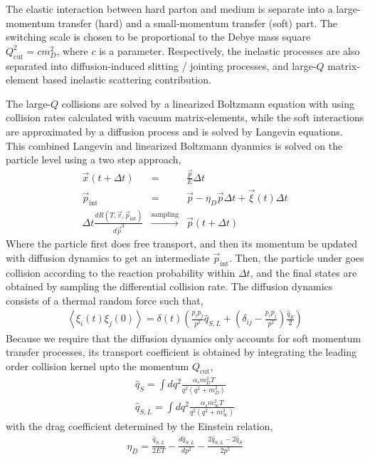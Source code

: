 \documentclass[aps, prc, reprint, amsmath, groupedaddress, nofootinbib]{revtex4-1}
\begin{document}
The elastic interaction between hard parton and medium is separate into a large-momentum transfer (hard) and a small-momentum transfer (soft) part.
The switching scale is chosen to be proportional to the Debye mass square $Q_{\textrm{cut}}^2 = c m_D^2$, where $c$ is a parameter.
Respectively, the inelastic processes are also separated into diffusion-induced slitting / jointing processes, and large-$Q$ matrix-element based inelastic scattering contribution.

The large-$Q$ collisions are solved by a linearized Boltzmann equation with using collision rates calculated with vacuum matrix-elements, while the soft interactions are approximated by a diffusion process and is solved by Langevin equations.
This combined Langevin and linearized Boltzmann dyanmics is solved on the particle level using a two step approach,
\begin{eqnarray}
\vec{x}(t+\Delta t) &=& \frac{\vec{p}}{E}\Delta t\\
\vec{p}_{\textrm{int}} &=& \vec{p} - \eta_D \vec{p} \Delta t + \vec{\xi}(t) \Delta t\\
\Delta t\frac{dR(T, \vec{v}, \vec{p}_{\textrm{int}})}{d\vec{p}^3} &\xrightarrow{\textrm{sampling}}& \vec{p}(t+\Delta t)
\end{eqnarray}
Where the particle first does free transport, and then its momentum be updated with diffusion dynamics to get an intermediate $\vec{p}_{\textrm{int}}$. 
Then, the particle under goes collision according to the reaction probability within $\Delta t$, and the final states are obtained by sampling the differential collision rate.
The diffusion dynamics consists of a thermal random force such that,
\begin{eqnarray}
\left\langle\xi_i(t)\xi_j(0)\right\rangle = \delta(t) \left(
\frac{p_i p_j}{p^2}\hat{q}_{S, L} + \left(
\delta_{ij}-\frac{p_i p_j}{p^2}
\right)\frac{\hat{q}_S}{2} 
\right)
\end{eqnarray}
Because we require that the diffusion dynamics only accounts for soft momentum transfer processes, its transport coefficient is obtained by integrating the leading order collision kernel upto the momentum $Q_{\textrm{cut}}$,
\begin{eqnarray}
\hat{q}_S = \int dq^2 \frac{\alpha_s m_D^2 T}{q^2 (q^2+m_D^2)} \\
\hat{q}_{S,L} = \int dq^2 \frac{\alpha_s m_\infty^2 T}{q^2 (q^2+m_\infty^2)}
\end{eqnarray}
with the drag coefficient determined by the Einstein relation,
\begin{eqnarray}
\eta_D = \frac{\hat{q}_{S,L}}{2ET} - \frac{d\hat{q}_{S,L}}{dp^2} - \frac{2\hat{q}_{S,L} - 2\hat{q}_S}{2p^2}
\end{eqnarray}
\end{document}
